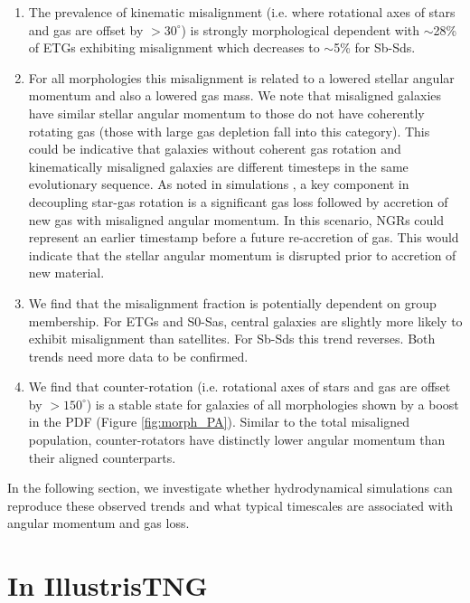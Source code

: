\begin{enumerate}
    \item The prevalence of kinematic misalignment (i.e. where rotational axes of stars and gas are offset by $> 30^{\circ}$) is strongly morphological dependent with $\sim$28\% of ETGs exhibiting misalignment which decreases to $\sim$5\% for Sb-Sds.
    
    \item For all morphologies this misalignment is related to a lowered stellar angular momentum and also a lowered gas mass. We note that misaligned galaxies have similar stellar angular momentum to those do not have coherently rotating gas (those with large gas depletion fall into this category). This could be indicative that galaxies without coherent gas rotation and kinematically misaligned galaxies are different timesteps in the same evolutionary sequence. As noted in simulations \citep[][]{vdvoort2015, starkenburg+19}, a key component in decoupling star-gas rotation is a significant gas loss followed by accretion of new gas with misaligned angular momentum. In this scenario, NGRs could represent an earlier timestamp before a future re-accretion of gas. This would indicate that the stellar angular momentum is disrupted prior to accretion of new material. 
    
    \item We find that the misalignment fraction is potentially dependent on group membership. For ETGs and S0-Sas, central galaxies are slightly more likely to exhibit misalignment than satellites. For Sb-Sds this trend reverses. Both trends need more data to be confirmed. 
    
    \item We find that counter-rotation (i.e. rotational axes of stars and gas are offset by $> 150^{\circ}$) is a stable state for galaxies of all morphologies shown by a boost in the PDF (Figure \ref{fig:morph_PA}). Similar to the total misaligned population, counter-rotators have distinctly lower angular momentum than their aligned counterparts. 

\end{enumerate}
In the following section, we investigate whether hydrodynamical simulations can reproduce these observed trends and what typical timescales are associated with angular momentum and gas loss.

\section{In IllustrisTNG} \label{sec:tng_kin_mis}
